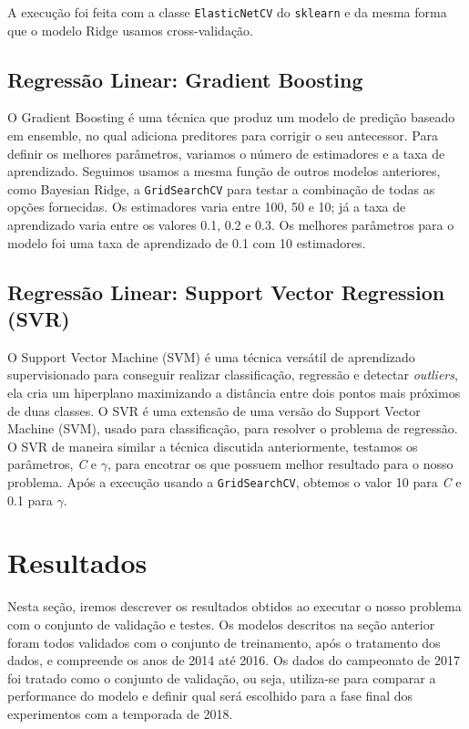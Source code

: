 \documentclass[conference]{IEEEtran}
\newcommand{\ttt}[1]{{\texttt{#1}}}
\newcommand{\tit}[1]{{\textit{#1}}}
\begin{document}
A   execução  foi   feita   com  a   classe  \ttt{ElasticNetCV}   do
\ttt{sklearn}   e  da   mesma  forma   que  o   modelo  Ridge   usamos
cross-validação.

\subsection{Regressão Linear: Gradient Boosting}

O  Gradient  Boosting  \cite{breiman1997arcing} é  uma  técnica  que
produz  um  modelo   de  predição  baseado  em   ensemble,  no  qual
adiciona preditores  para corrigir o  seu antecessor. Para  definir os
melhores parâmetros,  variamos o número  de estimadores e a  taxa de
aprendizado.  Seguimos  usamos  a  mesma função  de  outros  modelos
anteriores, como  Bayesian Ridge,  a \ttt{GridSearchCV} para  testar a
combinação  de todas  as opções  fornecidas. Os  estimadores varia
entre 100, 50 e  10; já a taxa de aprendizado  varia entre os valores
0.1, 0.2 e 0.3. Os melhores parâmetros  para o modelo foi uma taxa de
aprendizado de 0.1 com 10 estimadores.

\subsection{Regressão Linear: Support Vector Regression (SVR)}

O  Support  Vector   Machine  (SVM)  é  uma   técnica  versátil  de
aprendizado  supervisionado para  conseguir realizar  classificação,
regressão  e   detectar  \tit{outliers},   ela  cria   um  hiperplano
maximizando  a distância  entre dois  pontos mais  próximos de  duas
classes.  O SVR  é uma  extensão de  uma versão  do Support  Vector
Machine (SVM),  usado para  classificação, para resolver  o problema
de  regressão.  O  SVR  de   maneira  similar  a  técnica  discutida
anteriormente,  testamos  os  parâmetros, \tit{C}  e  $\gamma$,  para
encotrar os que possuem melhor  resultado para o nosso problema. Após
a  execução usando  a \ttt{GridSearchCV},  obtemos o  valor 10  para
\tit{C} e 0.1 para $\gamma$.

\section{Resultados}

Nesta seção,  iremos descrever os  resultados obtidos ao  executar o
nosso  problema com  o conjunto  de validação  e testes.  Os modelos
descritos na seção anterior foram  todos validados com o conjunto de
treinamento, após  o tratamento  dos dados, e  compreende os  anos de
2014  até 2016.  Os  dados do  campeonato de  2017  foi tratado  como
o  conjunto  de  validação,  ou seja,  utiliza-se  para  comparar  a
performance do modelo e definir qual será escolhido para a fase final
dos experimentos com a temporada de 2018.
\end{document}
